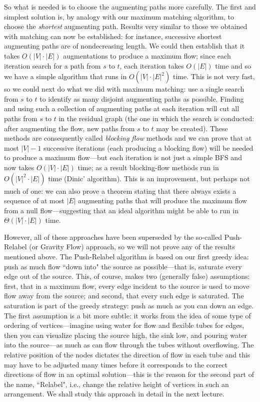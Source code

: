 \documentclass[11pt]{article}
\begin{document}
So what is needed is to choose the augmenting paths more carefully.
The first and simplest solution is, by analogy with our maximum matching
algorithm, to choose the \emph{shortest} augmenting path.
Results very similar to those we obtained with matching can now be
established: for instance, successive shortest augmenting paths are
of nondecreasing length.  We could then establish that it takes
$O(|V|\cdot |E|)$ augmentations to produce a maximum flow; since each
iteration search for a path from $s$ to $t$, each iteration takes $O(|E|)$
time and so we have a simple algorithm that runs in $O(|V|\cdot |E|^2)$ time.
This is not very fast, so we could next do what we did with maximum matching:
use a single search from $s$ to $t$ to identify as many disjoint augmenting
paths as possible.  Finding and using such a collection of augmenting
paths at each iteration will cut all paths from $s$ to $t$ in the residual
graph (the one in which the search is conducted: after augmenting the flow,
new paths from $s$ to $t$ may be created).  These methods are consequently
called \emph{blocking flow} methods and we can prove that at most $|V|-1$
successive iterations (each producing a blocking flow) will be needed
to produce a maximum flow---but each iteration is not just a simple BFS
and now takes $O(|V|\cdot|E|)$ time; as a result blocking-flow methods
run in $O(|V|^2\cdot|E|)$ time (Dinic' algorithm).
 This is an improvement, but perhaps
not much of one: we can also prove a theorem stating that there always
exists a sequence of at most $|E|$ augmenting paths that will produce the
maximum flow from a null flow---suggesting that an ideal algorithm might
be able to run in $\Theta(|V|\cdot|E|)$ time.

However, all of these approaches have been superseded by the so-called
Push-Relabel (or Gravity Flow) approach, so we will not prove any
of the results mentioned above.  The Push-Relabel algorithm is based
on our first greedy idea: push as much flow ``down into" the source as
possible---that is, saturate every edge out of the source.  This, of course,
makes two (generally false) assumptions: first, that in a maximum flow,
every edge incident to the source is used to move flow away from the source;
and second, that every such edge is saturated.   The saturation is part
of the greedy strategy: push as much as you can down an edge.  The first
assumption is a bit more subtle: it works from the idea of some type of ordering
of vertices---imagine using water for flow and flexible tubes for edges, then
you can visualize placing the source high, the sink low, and pouring water
into the source---as much as can flow through the tubes without overflowing.
The relative position of the nodes dictates the direction of flow in each tube
and this may have to be adjusted many times before it corresponds to the
correct directions of flow in an optimal solution---this is the reason for the
second part of the name, ``Relabel", i.e., change the relative height of
vertices in such an arrangement.  We shall study this approach in detail
in the next lecture.
\end{document}
